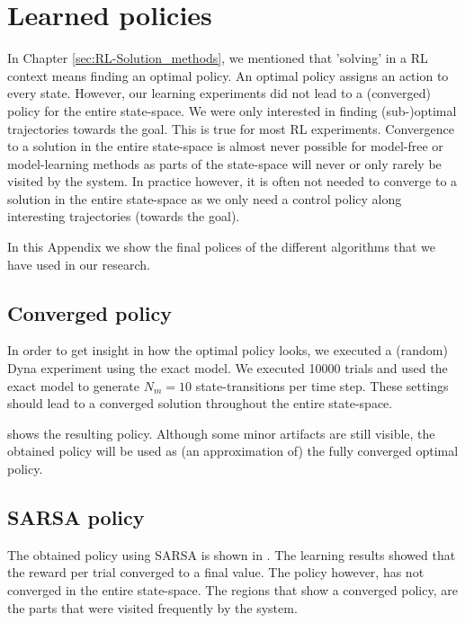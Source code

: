 \chapter{Learned policies}\label{app:Policies}

In Chapter \ref{sec:RL-Solution_methods}, we mentioned that 'solving' in a \ac{RL} context means finding an optimal policy. An optimal policy assigns an action to every state. However, our learning experiments did not lead to a (converged) policy for the entire state-space. We were only interested in finding (sub-)optimal trajectories towards the goal. This is true for most \ac{RL} experiments. Convergence to a solution in the entire state-space is almost never possible for model-free or model-learning methods as parts of the state-space will never or only rarely be visited by the system. In practice however, it is often not needed to converge to a solution in the entire state-space as we only need a control policy along interesting trajectories (towards the goal).

In this Appendix we show the final polices of the different algorithms that we have used in our research.


\section{Converged policy}
In order to get insight in how the optimal policy looks, we executed a (random) Dyna experiment using the exact model. We executed 10000 trials and used the exact model to generate $N_m=10$ state-transitions per time step. These settings should lead to a converged solution throughout the entire state-space.

 shows the resulting policy. Although some minor artifacts are still visible, the obtained policy will be used as (an approximation of) the fully converged optimal policy.



\section{SARSA policy}
The obtained policy using SARSA is shown in . The learning results showed that the reward per trial converged to a final value. The policy however, has not converged in the entire state-space. The regions that show a converged policy, are the parts that were visited frequently by the system.

